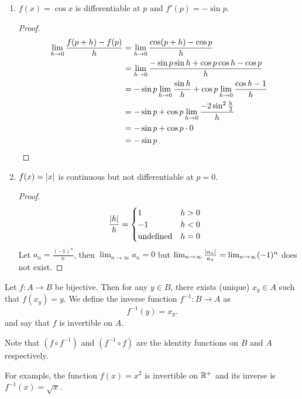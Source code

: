 \documentclass[12pt]{article}
\begin{document}
\begin{example}
\begin{enumerate}[label=(\alph*)]
        \item $f(x) = \cos x$ is differentiable at $p$ and $f'(p) = - \sin p$.
        \begin{proof}
            \begin{align*}
                \lim_{h \to 0} \frac{f(p + h) - f(p)}{h} &= \lim_{h \to 0} \frac{\cos(p + h) - \cos p}{h} \\
                &= \lim_{h \to 0} \frac{- \sin p \sin h + \cos p \cos h - \cos p}{h} \\
                &= - \sin p \lim_{h \to 0} \frac{\sin h}{h} + \cos p \lim_{h \to 0} \frac{\cos h - 1}{h} \\
                &= - \sin p + \cos p \lim_{h \to 0} \frac{-2 \sin^{2} \frac{h}{2}}{h} \\
                &= - \sin p + \cos p \cdot 0 \\
                &= - \sin p \qedhere
            \end{align*}
        \end{proof}

        \item $f(x) = \abs{ x }$ is continuous but not differentiable at $p = 0$.
        \begin{proof}
            \begin{align*}
                \frac{\abs{ h }}{h} &= \begin{cases}
                    1 & h > 0 \\
                    -1 & h < 0 \\
                    \text{undefined} & h = 0
                \end{cases}
            \end{align*}
            Let $a_{n} = \frac{(-1)^{n}}{n}$, then $\lim_{n \to \infty} a_{n} = 0$ but $\lim_{n \to \infty} \frac{\abs{ a_{n} }}{a_{n}} = \lim_{n \to \infty} (-1)^{n}$ does not exist.
        \end{proof}
    \end{enumerate}
\end{example}

\begin{defn} \label{defn:inverse}
    Let $f : A \to B$ be bijective. Then for any $y \in B$, there exists (unique) $x_{y} \in A$ such that $f(x_{y}) = y$. We define the inverse function $f^{-1} : B \to A$ as \[
        f^{-1}(y) = x_{y}.
    \] and say that $f$ is invertible on $A$.

    Note that $(f \circ f^{-1})$ and $(f^{-1} \circ f)$ are the identity functions on $B$ and $A$ respectively.
    
    For example, the function $f(x) = x^{2}$ is invertible on $\mathbb{R}^{+}$ and its inverse is $f^{-1}(x) = \sqrt{x}$.
\end{defn}
\end{document}
